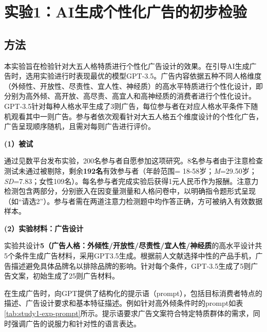 \section{实验1：AI生成个性化广告的初步检验}

\subsection{方法}
本实验旨在检验针对大五人格特质进行个性化广告设计的效果。在引导AI生成广告时，选用实验进行时表现最优的模型GPT-3.5。广告内容依据五种不同人格维度（外倾性、开放性、尽责性、宜人性、神经质）的高水平特质进行个性化设计，即分别为高外倾、高开放、高尽责、高宜人和高神经质的消费者进行个性化设计。GPT-3.5针对每种人格水平生成了3则广告，每位参与者在对应人格水平条件下随机观看其中一则广告。参与者依次观看针对大五人格五个维度设计的个性化广告，广告呈现顺序随机，且需对每则广告进行评价。

\textbf{(1）被试}

通过见数平台发布实验，200名参与者自愿参加这项研究。8名参与者由于注意检查测试未通过被剔除，剩余\textbf{192名}有效参与者（年龄范围= 18-58岁；\textit{M}=29.50岁；\textit{SD}=7.83；女性109名）。每名参与者完成实验后获得1元人民币作为报酬。注意力检测包含两部分，分别嵌入在因变量测量和人格问卷中，以明确指令题形式呈现（如“请选2”）。参与者需在两道注意力检测题中均作答正确，方可被纳入有效数据样本。

\textbf{(2）实验材料：广告设计}

实验共设计\textbf{5（广告人格：外倾性/开放性/尽责性/宜人性/神经质}的高水平设计共5个条件生成广告材料，采用GPT3.5生成。根据前人文献选择中性的产品手机，广告描述避免具体品牌名以排除品牌的影响。针对每个条件，GPT-3.5生成了5则广告文案，初始生成了25则广告材料。

在生成广告时，向GPT提供了结构化的提示语（prompt），包括目标消费者特点的描述、广告设计要求和基本特征描述。例如针对高外倾条件时的prompt如表\ref{tab:study1-exp-prompt}所示。提示语要求广告文案符合特定特质群体的需求，同时强调广告的说服力和针对性的语言表达。

